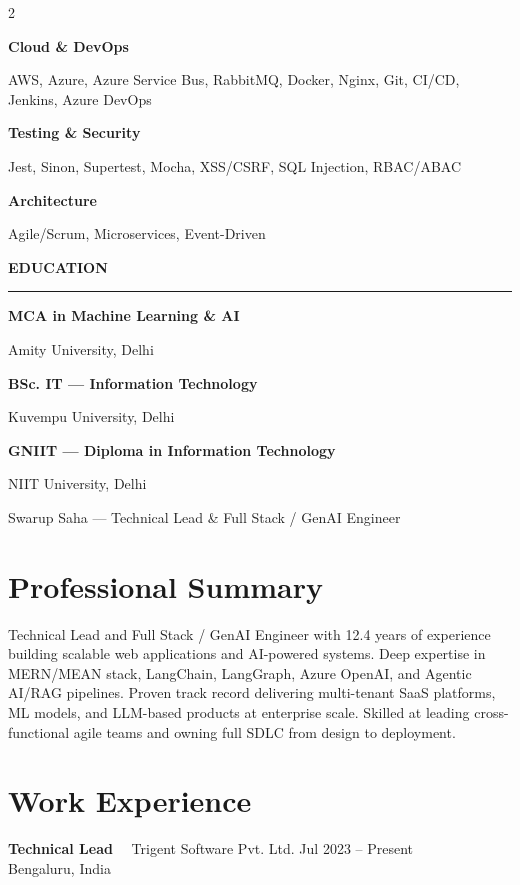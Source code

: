\documentclass[10pt,a4paper]{article}
\newcommand{\sideheading}[1]{%
  \vspace{6pt}
  {\fontsize{9.3}{11}\bfseries\color{white}#1}\par
  \vspace{2pt}
  \textcolor{sidebarline}{\rule{\linewidth}{0.45pt}}
  \vspace{3pt}
}
\newcommand{\sideitem}[2]{%
  {\fontsize{8}{9.5}\bfseries\color{white}#1}\par
  {\fontsize{7.8}{9.5}\color{white}#2}\par
  \vspace{3pt}
}
\newcommand{\job}[4]{%
  \vspace{2pt}
  {\fontsize{10}{11.5}\bfseries\color{sidebar}#1}
  {\color{textmuted}\ \textbar\ #2}
  \hfill
  {\fontsize{8.5}{10}\color{accent}#3}\\
  {\fontsize{8.4}{10}\color{textmuted}#4}
  \vspace{1pt}
}
\begin{document}
\begin{paracol}{2}
{\begin{minipage}[t][10.95in][t]{\dimexpr\linewidth-2\fboxsep\relax}
\sideitem{Cloud \& DevOps}{AWS, Azure, Azure Service Bus, RabbitMQ, Docker, Nginx, Git, CI/CD, Jenkins, Azure DevOps}

\sideitem{Testing \& Security}{Jest, Sinon, Supertest, Mocha, XSS/CSRF, SQL Injection, RBAC/ABAC}

\sideitem{Architecture}{Agile/Scrum, Microservices, Event-Driven}

\sideheading{EDUCATION}

\sideitem{MCA in Machine Learning \& AI}{Amity University, Delhi}

\sideitem{BSc. IT — Information Technology}{Kuvempu University, Delhi}

\sideitem{GNIIT — Diploma in Information Technology}{NIIT University, Delhi}

\vfill
\end{minipage}
}

\switchcolumn


{\fontsize{0.1}{0.1}\color{white}
Swarup Saha — Technical Lead \& Full Stack / GenAI Engineer
}

\section{Professional Summary}

{\fontsize{8.7}{12}\color{textmain}
Technical Lead and Full Stack / GenAI Engineer with 12.4 years of experience building scalable
web applications and AI-powered systems. Deep expertise in MERN/MEAN stack, LangChain,
LangGraph, Azure OpenAI, and Agentic AI/RAG pipelines. Proven track record delivering
multi-tenant SaaS platforms, ML models, and LLM-based products at enterprise scale. Skilled
at leading cross-functional agile teams and owning full SDLC from design to deployment.
}

\section{Work Experience}

\job{Technical Lead}{Trigent Software Pvt. Ltd.}{Jul 2023 -- Present}{Bengaluru, India}


\end{paracol}
\end{document}
